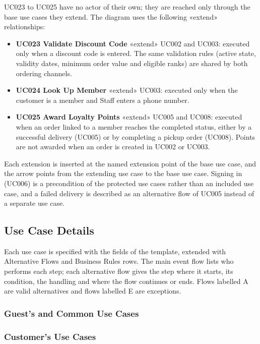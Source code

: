 UC023 to UC025 have no actor of their own; they are reached only through the base use cases they extend. The diagram uses the following «extend» relationships:

\begin{itemize}
  \item \textbf{UC023 Validate Discount Code} «extend» UC002 and UC003: executed only when a discount code is entered. The same validation rules (active state, validity dates, minimum order value and eligible ranks) are shared by both ordering channels.
  \item \textbf{UC024 Look Up Member} «extend» UC003: executed only when the customer is a member and Staff enters a phone number.
  \item \textbf{UC025 Award Loyalty Points} «extend» UC005 and UC008: executed when an order linked to a member reaches the completed status, either by a successful delivery (UC005) or by completing a pickup order (UC008). Points are not awarded when an order is created in UC002 or UC003.
\end{itemize}

Each extension is inserted at the named extension point of the base use case, and the arrow points from the extending use case to the base use case. Signing in (UC006) is a precondition of the protected use cases rather than an included use case, and a failed delivery is described as an alternative flow of UC005 instead of a separate use case.

\subsection{Use Case Details}\label{sec:uc-details}

Each use case is specified with the fields of the template, extended with Alternative Flows and Business Rules rows. The main event flow lists who performs each step; each alternative flow gives the step where it starts, its condition, the handling and where the flow continues or ends. Flows labelled A are valid alternatives and flows labelled E are exceptions.

\subsubsection{Guest's and Common Use Cases}





\subsubsection{Customer's Use Cases}

